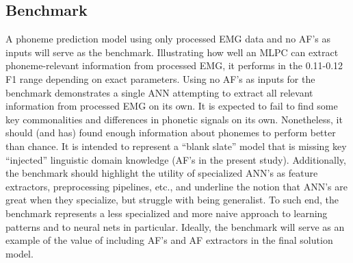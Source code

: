 \documentclass[conference]{IEEEtran}
\begin{document}

\subsection{Benchmark}
A phoneme prediction model using only processed EMG data and no AF's as inputs will serve as the benchmark. Illustrating how well an MLPC can extract phoneme-relevant information from processed EMG, it performs in the 0.11-0.12 F1 range depending on exact parameters. Using no AF's as inputs for the benchmark demonstrates a single ANN attempting to extract all relevant information from processed EMG on its own. It is expected to fail to find some key commonalities and differences in phonetic signals on its own. Nonetheless, it should (and has) found enough information about phonemes to perform better than chance. It is intended to represent a “blank slate” model that is missing key “injected” linguistic domain knowledge (AF's in the present study). Additionally, the benchmark should highlight the utility of specialized ANN's as feature extractors, preprocessing pipelines, etc., and underline the notion that ANN's are great when they specialize, but struggle with being generalist. To such end, the benchmark represents a less specialized and more naive approach to learning patterns and to neural nets in particular. Ideally, the benchmark will serve as an example of the value of including AF's and AF extractors in the final solution model.
\end{document}
